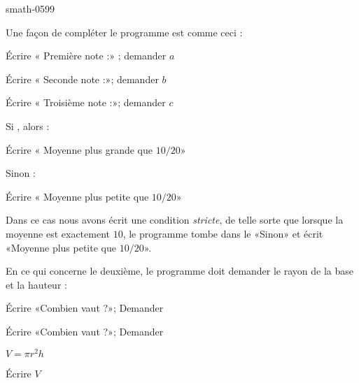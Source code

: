 
\begin{corrige}{smath-0599}


    Une façon de compléter le programme est comme ceci :

    \begin{fmpage}{0.9\linewidth}

    Écrire « Première note :» ; demander \( a\)

    Écrire « Seconde note :»;   demander \( b\)

    Écrire « Troisième note :»; demander \( c\)

    Si  , alors :

    \hspace{0.5cm} Écrire « Moyenne plus grande que \( 10/20\)» 

    Sinon :

    \hspace{0.5cm} Écrire « Moyenne plus petite que \( 10/20\)» 

\end{fmpage}

Dans ce cas nous avons écrit une condition \emph{stricte}, de telle sorte que lorsque la moyenne est exactement \( 10\), le programme tombe dans le «Sinon» et écrit «Moyenne plus petite que \( 10/20\)».

    En ce qui concerne le deuxième, le programme doit demander le rayon de la base et la hauteur :

    \begin{fmpage}{0.9\linewidth}

        Écrire «Combien vaut  ?»; Demander 

        Écrire «Combien vaut  ?»; Demander 

    \( V=\pi r^2h\)

    Écrire \( V\)

\end{fmpage}
\end{corrige}
